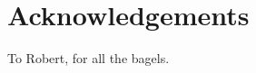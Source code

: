 \documentclass{acmsiggraph}
\begin{document}



\section*{Acknowledgements}

To Robert, for all the bagels.


\nocite{*}

\end{document}

